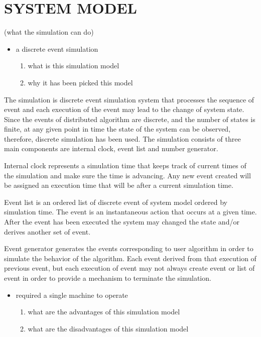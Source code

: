 \section{SYSTEM MODEL}
(what the simulation can do)
\begin{itemize}
\item a discrete event simulation
    \begin{enumerate}
    \item what is this simulation model
    \item why it has been picked this model
    \end{enumerate}
\end{itemize}

The simulation is discrete event simulation system that processes the sequence of event and each execution of the event may lead to the change of system state. Since the events of distributed algorithm are discrete, and the number of states is finite, at any given point in time the state of the system can be observed, therefore, discrete simulation has been used. The simulation consists of three main components are internal clock, event list and number generator.

Internal clock represents a simulation time that keeps track of current times of the simulation and make sure the time is advancing. Any new event created will be assigned an execution time that will be after a current simulation time.

Event list is an ordered list of discrete event of system model ordered by simulation time. The event is an instantaneous action that occurs at a given time. After the event has been executed the system may changed the state and/or derives another set of event.

Event generator generates the events corresponding to user algorithm in order to simulate the behavior of the algorithm. Each event derived from that execution of previous event, but each execution of event may not always create event or list of event in order to provide a mechanism to terminate the simulation.

\begin{itemize}
\item required a single machine to operate
    \begin{enumerate}
    \item what are the advantages of this simulation model
    \item what are the disadvantages of this simulation model
    \end{enumerate}
\end{itemize}

